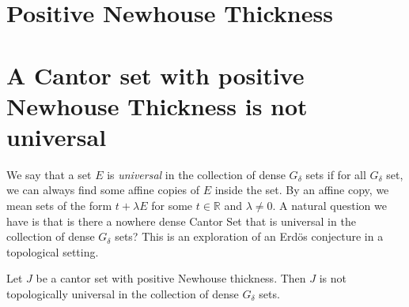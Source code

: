 \section{Positive Newhouse Thickness}



\section{A Cantor set with positive Newhouse Thickness is not universal}
We  say that a set $E$ is  {\it universal} in the collection of dense $G_{\delta}$ sets if for all $G_{\delta}$ set,  we can  always find some affine copies of $E$ inside the set. By an affine copy, we  mean sets of  the form $t+\lambda E$ for some $t\in{\mathbb R}$ and $\lambda\ne 0$. A natural question we have is that  is there a nowhere dense Cantor Set that is universal in the collection of dense $G_\delta$ sets? This is an exploration of an Erd\"{o}s conjecture in a topological setting. 

\begin{theorem}\label{theorem_positive_NW}
Let $J$ be a cantor set with positive Newhouse thickness.  Then $J$ is not topologically universal in the collection of dense $G_\delta$ sets.
\end{theorem}

